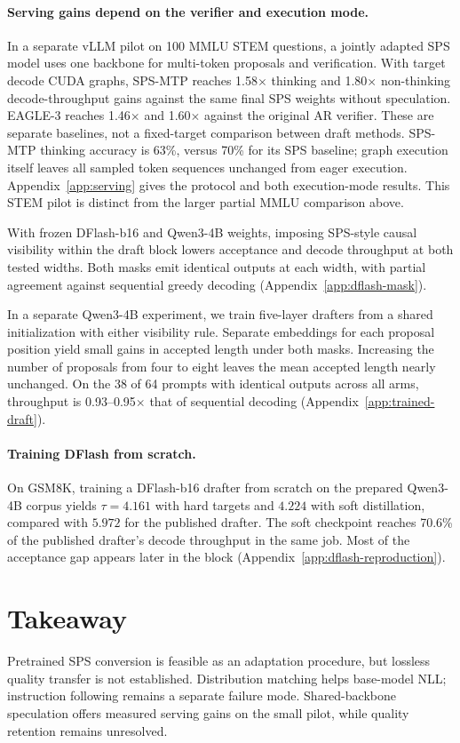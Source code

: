 \documentclass[11pt]{article}
\begin{document}
\paragraph{Serving gains depend on the verifier and execution mode.}
In a separate vLLM pilot on 100 MMLU STEM questions, a jointly adapted SPS model uses one backbone for multi-token proposals and verification. With target decode CUDA graphs, SPS-MTP reaches 1.58$\times$ thinking and 1.80$\times$ non-thinking decode-throughput gains against the same final SPS weights without speculation. EAGLE-3 reaches 1.46$\times$ and 1.60$\times$ against the original AR verifier. These are separate baselines, not a fixed-target comparison between draft methods. SPS-MTP thinking accuracy is 63\%, versus 70\% for its SPS baseline; graph execution itself leaves all sampled token sequences unchanged from eager execution. Appendix~\ref{app:serving} gives the protocol and both execution-mode results. This STEM pilot is distinct from the larger partial MMLU comparison above.

With frozen DFlash-b16 and Qwen3-4B weights, imposing SPS-style causal visibility within the draft block lowers acceptance and decode throughput at both tested widths. Both masks emit identical outputs at each width, with partial agreement against sequential greedy decoding (Appendix~\ref{app:dflash-mask}).

In a separate Qwen3-4B experiment, we train five-layer drafters from a shared initialization with either visibility rule. Separate embeddings for each proposal position yield small gains in accepted length under both masks. Increasing the number of proposals from four to eight leaves the mean accepted length nearly unchanged. On the 38 of 64 prompts with identical outputs across all arms, throughput is 0.93--0.95$\times$ that of sequential decoding (Appendix~\ref{app:trained-draft}).

\paragraph{Training DFlash from scratch.}
On GSM8K, training a DFlash-b16 drafter from scratch on the prepared Qwen3-4B corpus yields $\tau=4.161$ with hard targets and $4.224$ with soft distillation, compared with $5.972$ for the published drafter. The soft checkpoint reaches 70.6\% of the published drafter's decode throughput in the same job. Most of the acceptance gap appears later in the block (Appendix~\ref{app:dflash-reproduction}).

\section{Takeaway}
Pretrained SPS conversion is feasible as an adaptation procedure, but lossless quality transfer is not established. Distribution matching helps base-model NLL; instruction following remains a separate failure mode. Shared-backbone speculation offers measured serving gains on the small pilot, while quality retention remains unresolved.
\end{document}
